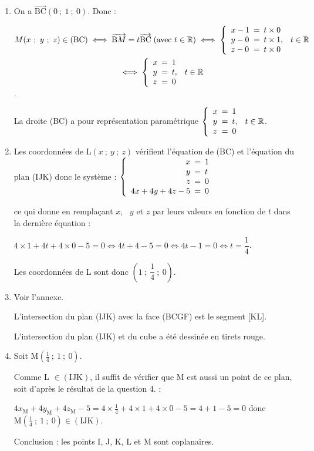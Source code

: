 \documentclass[10pt]{article}
\providecommand{\R}{\mathbb{R}}
\providecommand{\vect}[1]{\overrightarrow{#1}}
\begin{document}
\begin{enumerate}
Le plan (IJK) a pour équation cartésienne $4x + 4y + 4z - 5 = 0$.

\item 
On a $\vect{\text{BC}}\left (0~;~1~;~0 \right  )$. Donc :

$\begin{gathered}M(x~;~y~;~z) \in (\text{BC}) \iff  \vect{\text{B}M} = t\vect{\text{BC}} \;(\text{avec }t\in\R) 
\iff \left\{\begin{array}{l !{=} l}
x - 1&t \times 0\\
y - 0&t \times 1,\\
z - 0 &t \times 0
\end{array}\right.\, t \in \R \\
\iff 
\left\{\begin{array}{l !{=} l}
x &1\\
y &t,\\
z &0
\end{array}\right.\, t \in \R\end{gathered}$.

La droite (BC) a pour représentation paramétrique
$\left\{\begin{array}{l !{=} l}
x &1\\
y &t,\\
z &0
\end{array}\right.\, t \in \R$.

\item 
Les coordonnées de L$(x~;~y~;~z)$ vérifient l'équation de (BC) et l'équation du plan (IJK) donc le système :
$\left\{\begin{array}{r !{=} l}
x &1\\
y &t\\
z &0\\
4x + 4y + 4z - 5 & 0
\end{array}\right.$ 

ce qui donne en remplaçant $x$, \, $y$ et $z$ par leurs valeurs en fonction de $t$ dans la dernière équation :

$4 \times  1 +  4t + 4 \times 0 - 5 = 0 \iff 4t + 4 - 5 = 0 \iff 4t - 1 = 0 \iff t = \dfrac{1}{4}$.

Les coordonnées de L sont donc $\left(1~;~\dfrac{1}{4}~;~0\right)$.
\item 
Voir l'annexe. 

L'intersection du plan (IJK) avec la face (BCGF) est le segment [KL].

L'intersection du plan (IJK) et du cube a été dessinée en tirets rouge.
\item Soit M$\left(\frac{1}{4}~;~1~;~0\right)$.

Comme L $\in (\text{IJK})$, il suffit de vérifier que M est aussi un point de ce plan, soit d'après le résultat de la question 4. :



$4 x_{\text{M}} + 4 y_{\text{M}} + 4 z_{\text{M}} - 5 = 4\times \frac{1}{4} + 4 \times 1 + 4 \times 0 - 5=  4 + 1 - 5 = 0$ donc $\text{M}\left(\frac{1}{4}~;~1~;~0\right) \in (\text{IJK})$.

Conclusion : les points I, J, K, L et M sont coplanaires.
\end{enumerate}
\end{document}
